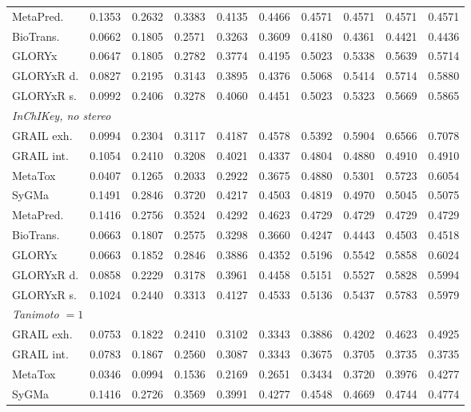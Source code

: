 \begin{table}[t]
\begin{threeparttable}
\begin{tabular}{lrrrrrrrrr}
\quad MetaPred. & 0.1353 & 0.2632 & 0.3383 & 0.4135 & 0.4466 & 0.4571 & 0.4571 & 0.4571 & 0.4571 \\
\quad BioTrans. & 0.0662 & 0.1805 & 0.2571 & 0.3263 & 0.3609 & 0.4180 & 0.4361 & 0.4421 & 0.4436 \\
\quad GLORYx & 0.0647 & 0.1805 & 0.2782 & 0.3774 & 0.4195 & 0.5023 & 0.5338 & 0.5639 & 0.5714 \\
\quad GLORYxR d. & 0.0827 & 0.2195 & 0.3143 & 0.3895 & 0.4376 & 0.5068 & 0.5414 & 0.5714 & 0.5880 \\
\quad GLORYxR s. & 0.0992 & 0.2406 & 0.3278 & 0.4060 & 0.4451 & 0.5023 & 0.5323 & 0.5669 & 0.5865 \\
\midrule
\multicolumn{10}{l}{\emph{InChIKey, no stereo}} \\
\quad GRAIL exh. & 0.0994 & 0.2304 & 0.3117 & 0.4187 & 0.4578 & 0.5392 & 0.5904 & 0.6566 & 0.7078 \\
\quad GRAIL int. & 0.1054 & 0.2410 & 0.3208 & 0.4021 & 0.4337 & 0.4804 & 0.4880 & 0.4910 & 0.4910 \\
\quad MetaTox & 0.0407 & 0.1265 & 0.2033 & 0.2922 & 0.3675 & 0.4880 & 0.5301 & 0.5723 & 0.6054 \\
\quad SyGMa & 0.1491 & 0.2846 & 0.3720 & 0.4217 & 0.4503 & 0.4819 & 0.4970 & 0.5045 & 0.5075 \\
\quad MetaPred. & 0.1416 & 0.2756 & 0.3524 & 0.4292 & 0.4623 & 0.4729 & 0.4729 & 0.4729 & 0.4729 \\
\quad BioTrans. & 0.0663 & 0.1807 & 0.2575 & 0.3298 & 0.3660 & 0.4247 & 0.4443 & 0.4503 & 0.4518 \\
\quad GLORYx & 0.0663 & 0.1852 & 0.2846 & 0.3886 & 0.4352 & 0.5196 & 0.5542 & 0.5858 & 0.6024 \\
\quad GLORYxR d. & 0.0858 & 0.2229 & 0.3178 & 0.3961 & 0.4458 & 0.5151 & 0.5527 & 0.5828 & 0.5994 \\
\quad GLORYxR s. & 0.1024 & 0.2440 & 0.3313 & 0.4127 & 0.4533 & 0.5136 & 0.5437 & 0.5783 & 0.5979 \\
\midrule
\multicolumn{10}{l}{\emph{Tanimoto $=1$}} \\
\quad GRAIL exh. & 0.0753 & 0.1822 & 0.2410 & 0.3102 & 0.3343 & 0.3886 & 0.4202 & 0.4623 & 0.4925 \\
\quad GRAIL int. & 0.0783 & 0.1867 & 0.2560 & 0.3087 & 0.3343 & 0.3675 & 0.3705 & 0.3735 & 0.3735 \\
\quad MetaTox & 0.0346 & 0.0994 & 0.1536 & 0.2169 & 0.2651 & 0.3434 & 0.3720 & 0.3976 & 0.4277 \\
\quad SyGMa & 0.1416 & 0.2726 & 0.3569 & 0.3991 & 0.4277 & 0.4548 & 0.4669 & 0.4744 & 0.4774 \\

\end{tabular}
\end{threeparttable}
\end{table}
